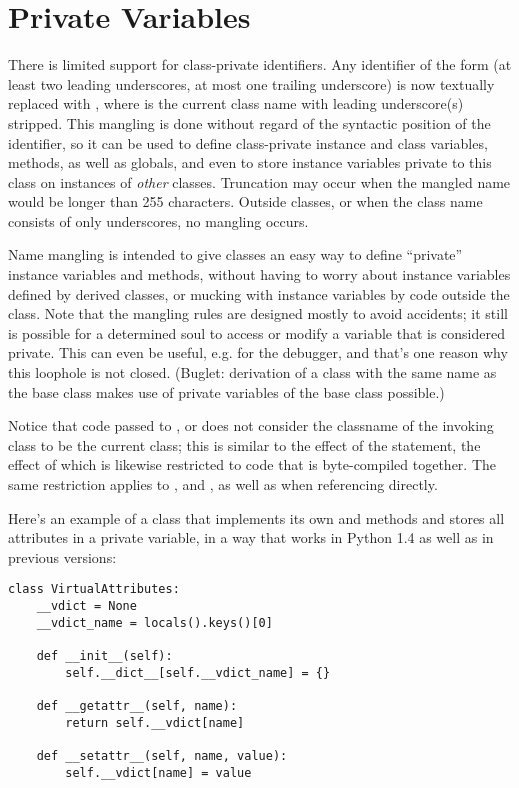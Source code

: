 \documentclass{manual}
\begin{document}
\section{Private Variables}
\label{private}

There is limited support for class-private
identifiers.  Any identifier of the form  (at least two
leading underscores, at most one trailing underscore) is now textually
replaced with , where  is the
current class name with leading underscore(s) stripped.  This mangling
is done without regard of the syntactic position of the identifier, so
it can be used to define class-private instance and class variables,
methods, as well as globals, and even to store instance variables
private to this class on instances of \emph{other} classes.  Truncation
may occur when the mangled name would be longer than 255 characters.
Outside classes, or when the class name consists of only underscores,
no mangling occurs.

Name mangling is intended to give classes an easy way to define
``private'' instance variables and methods, without having to worry
about instance variables defined by derived classes, or mucking with
instance variables by code outside the class.  Note that the mangling
rules are designed mostly to avoid accidents; it still is possible for
a determined soul to access or modify a variable that is considered
private.  This can even be useful, e.g. for the debugger, and that's
one reason why this loophole is not closed.  (Buglet: derivation of a
class with the same name as the base class makes use of private
variables of the base class possible.)

Notice that code passed to ,  or
 does not consider the classname of the invoking 
class to be the current class; this is similar to the effect of the 
 statement, the effect of which is likewise restricted to 
code that is byte-compiled together.  The same restriction applies to
,  and , as well as
when referencing  directly.

Here's an example of a class that implements its own
 and  methods and stores all
attributes in a private variable, in a way that works in Python 1.4 as
well as in previous versions:

\begin{verbatim}
class VirtualAttributes:
    __vdict = None
    __vdict_name = locals().keys()[0]
     
    def __init__(self):
        self.__dict__[self.__vdict_name] = {}
    
    def __getattr__(self, name):
        return self.__vdict[name]
    
    def __setattr__(self, name, value):
        self.__vdict[name] = value
\end{verbatim}
\end{document}
